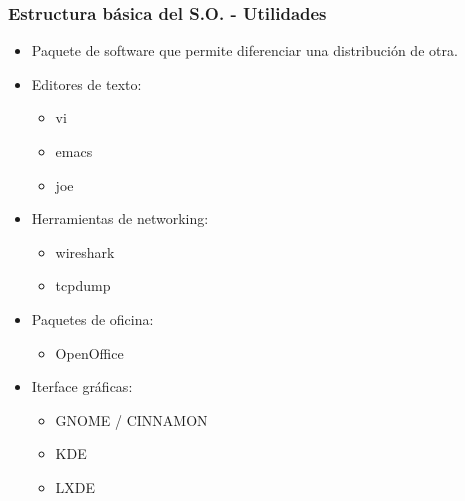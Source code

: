 \begin{frame}
	\frametitle{Estructura básica del S.O. - Utilidades}
	\begin{itemize}
		\item Paquete de software que permite diferenciar una distribución de otra.
		\item Editores de texto:
		\begin{itemize}
			\item vi
			\item emacs
			\item joe
		\end{itemize}
		\item Herramientas de networking:
		\begin{itemize}
			\item wireshark
			\item tcpdump
		\end{itemize}
		\item Paquetes de oficina:
		\begin{itemize}
			\item OpenOffice
		\end{itemize}
		\item Iterface gráficas:
		\begin{itemize}
			\item GNOME / CINNAMON
			\item KDE
			\item LXDE
		\end{itemize}		
	\end{itemize}
\end{frame}

